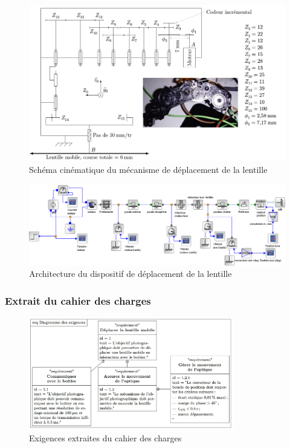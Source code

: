 \begin{figure}[!htb]
\begin{center}
\includegraphics[width=1.0\textwidth]{images/image_fig4.jpg}
\caption{Schéma cinématique du mécanisme de déplacement de la lentille \label{fig4}}
\end{center}
\end{figure}

\begin{figure}[!htb]
\begin{center}
\includegraphics[width=1.0\textwidth]{images/image13.png}
\caption{Architecture du dispositif de déplacement de la lentille \label{fig5}}
\end{center}
\end{figure}

\FloatBarrier
\subsubsection{Extrait du cahier des charges}\label{extrait-du-cahier-des-charges}

\begin{figure}[!htb]
\begin{center}
\includegraphics[width=0.8\textwidth]{images/image_fig6.jpg}
\caption{Exigences extraites du cahier des charges \label{fig6}}
\end{center}
\end{figure}


